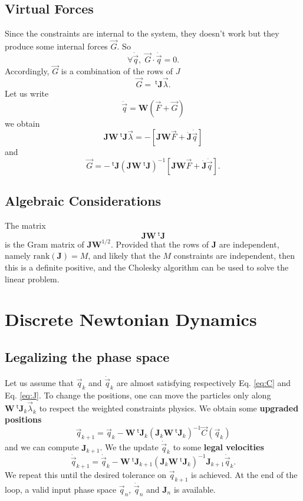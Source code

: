 \documentclass[aps,twocolumn]{revtex4}
\newcommand{\mymat}[1]{\boldsymbol{#1}}
\newcommand{\mytrn}[1]{{\!\!~^{\mathsf{t}}{#1}}}
\newcommand{\q}{\vec{q}}
\newcommand{\dq}{\dot{\q}}
\newcommand{\ddq}{\ddot{\q}}
\newcommand{\C}{\vec{C}}
\newcommand{\J}{\mymat{J}}
\newcommand{\dJ}{\dot{\J}}
\newcommand{\tJ}{\mytrn{\J}}
\newcommand{\G}{\vec{G}}
\newcommand{\W}{\mymat{W}}
\begin{document}
\subsection{Virtual Forces}
Since the constraints are internal to the system, they doesn't work but they produce some internal
forces $\G$. So
\begin{equation}
\forall \dq, \; \G\cdot\dq = 0.
\end{equation}
Accordingly, $\G$ is a combination of the rows of $J$
\begin{equation}
	\G = \tJ \vec{\lambda}.
\end{equation}
Let us write
\begin{equation}
	\ddq = \W \left( \vec{F} + \G \right)
\end{equation}
we obtain
\begin{equation}
	\J \W \tJ \vec{\lambda} = -\left\lbrack \J\W\vec{F} + \dJ \dq \right\rbrack
\end{equation}
and
\begin{equation}
	\G = - \tJ \left(\J \W \tJ \right)^{-1}\left\lbrack \J\W\vec{F} + \dJ \dq \right\rbrack.
\end{equation}

\subsection{Algebraic Considerations}
The matrix
\begin{equation}
	 \J \W \tJ 
\end{equation}
is the Gram matrix of $\J\W^{1/2}$.
Provided that the rows of $\J$ are independent, namely $\text{rank}(\J)=M$, and likely that the $M$ constraints are independent, 
then this is a definite positive, and the Cholesky algorithm can be used to solve the linear problem.

\section{Discrete Newtonian Dynamics}

\subsection{Legalizing the phase space}
Let us assume that $\q_k$ and $\dq_{k}$ are almost satisfying respectively Eq. \eqref{eq:C} and Eq. \eqref{eq:J}.
To change the positions, one can move the particles only along $\W\tJ_k \vec{\lambda}_k$ to respect the weighted constraints physics.
We obtain some \textbf{upgraded positions}
\begin{equation}
	\label{eq:legal_q}
	\q_{k+1} = \q_k - \W \tJ_k \left(\J_k \W \tJ_k \right)^{-1} \C(\q_k)
\end{equation}
and we can compute $\J_{k+1}$.
We the update $\dq_k$ to some \textbf{legal velocities}
\begin{equation}
	\label{eq:legal_dq}
	\dq_{k+1} = \dq_k - \W\tJ_{k+1} \left(\J_k \W \tJ_k \right)^{-1} \J_{k+1} \dq_k.
\end{equation}
We repeat this until the desired tolerance on $\q_{k+1}$ is achieved.
At the end of the loop, a valid input phase space $\q_{n}$, $\dq_{n}$ and $\J_n$ is available.
\end{document}
